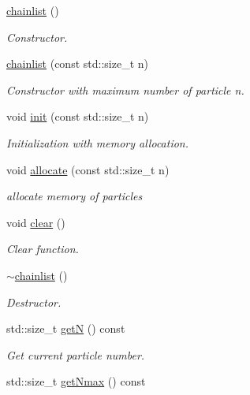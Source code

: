\begin{DoxyCompactItemize}
\item 
\hyperlink{classARC_1_1chainlist_a0199d3df0bde74ae090ca274e5e53858}{chainlist} ()
\begin{DoxyCompactList}\small\item\em Constructor. \end{DoxyCompactList}\item 
\hyperlink{classARC_1_1chainlist_aa38cbc27244c85fefb89320d7944956c}{chainlist} (const std\+::size\+\_\+t n)
\begin{DoxyCompactList}\small\item\em Constructor with maximum number of particle {\itshape n}. \end{DoxyCompactList}\item 
void \hyperlink{classARC_1_1chainlist_a82f296c7288678df8c279958304e58d8}{init} (const std\+::size\+\_\+t n)
\begin{DoxyCompactList}\small\item\em Initialization with memory allocation. \end{DoxyCompactList}\item 
void \hyperlink{classARC_1_1chainlist_a79dfad1e9aeafcee55a28983f8eaffbe}{allocate} (const std\+::size\+\_\+t n)
\begin{DoxyCompactList}\small\item\em allocate memory of particles \end{DoxyCompactList}\item 
void \hyperlink{classARC_1_1chainlist_aab62ed0d66f6dc32dce748d374c7f540}{clear} ()
\begin{DoxyCompactList}\small\item\em Clear function. \end{DoxyCompactList}\item 
\hyperlink{classARC_1_1chainlist_a878d216d065759eea60b2acf566f0f92}{$\sim$chainlist} ()
\begin{DoxyCompactList}\small\item\em Destructor. \end{DoxyCompactList}\item 
std\+::size\+\_\+t \hyperlink{classARC_1_1chainlist_a2ed7858b13620c086e2e52b5b8d8020c}{getN} () const
\begin{DoxyCompactList}\small\item\em Get current particle number. \end{DoxyCompactList}\item 
std\+::size\+\_\+t \hyperlink{classARC_1_1chainlist_a60cec732dad13b91f7835fc0cd604e5f}{get\+Nmax} () const

\end{DoxyCompactItemize}
